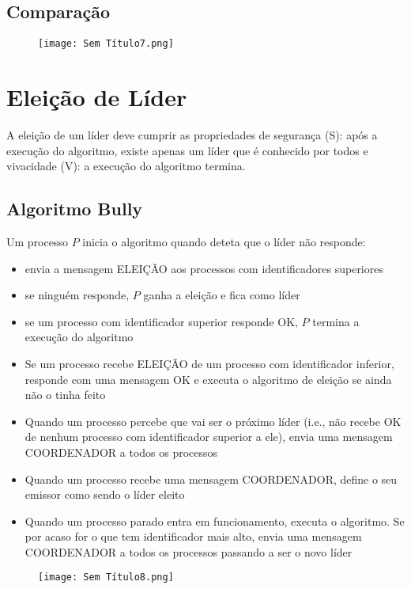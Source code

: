 \documentclass[10pt,a4paper]{report}
\begin{document}
\subsection{Comparação}
\begin{figure}[H]
\centering
\texttt{[image: Sem Título7.png]}
\end{figure}
\section{Eleição de Líder}
A eleição de um líder deve cumprir as propriedades de segurança (S): após a execução do algoritmo, existe apenas um líder que é conhecido por todos e vivacidade (V): a execução do algoritmo termina.
\subsection{Algoritmo Bully}
Um processo $P$ inicia o algoritmo quando deteta que o líder não responde:
\begin{itemize}
\item envia a mensagem ELEIÇÃO aos processos com identificadores superiores
\item se ninguém responde, $P$ ganha a eleição e fica como líder
\item se um processo com identificador superior responde OK, $P$ termina a execução do algoritmo
\item Se um processo recebe ELEIÇÃO de um processo com identificador inferior, responde com uma mensagem OK e executa o algoritmo de eleição se ainda não o tinha feito
\item Quando um processo percebe que vai ser o próximo líder (i.e., não recebe OK de nenhum processo com identificador superior a ele), envia uma mensagem COORDENADOR a todos os processos
\item Quando um processo recebe uma mensagem COORDENADOR, define o seu emissor como sendo o líder eleito
\item Quando um processo parado entra em funcionamento, executa o algoritmo. Se por acaso for o que tem identificador mais alto, envia uma mensagem COORDENADOR a todos os processos passando a ser o novo líder
\end{itemize}
\begin{figure}[H]
\centering
\texttt{[image: Sem Título8.png]}
\end{figure}
\end{document}
